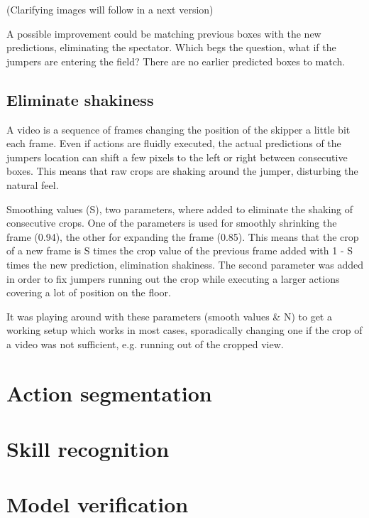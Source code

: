 (Clarifying images will follow in a next version)

A possible improvement could be matching previous boxes with the new predictions, eliminating the spectator. Which begs the question, what if the jumpers are entering the field? There are no earlier predicted boxes to match.

\subsection{Eliminate shakiness}

A video is a sequence of frames changing the position of the skipper a little bit each frame. Even if actions are fluidly executed, the actual predictions of the jumpers location can shift a few pixels to the left or right between consecutive boxes. This means that raw crops are shaking around the jumper, disturbing the natural feel.

Smoothing values (S), two parameters, where added to eliminate the shaking of consecutive crops. One of the parameters is used for smoothly shrinking the frame (0.94), the other for expanding the frame (0.85).
This means that the crop of a new frame is S times the crop value of the previous frame added with 1 - S times the new prediction, elimination shakiness. The second parameter was added in order to fix jumpers running out the crop while executing a larger actions covering a lot of position on the floor.

It was playing around with these parameters (smooth values \& N) to get a working setup which works in most cases, sporadically changing one if the crop of a video was not sufficient, e.g. running out of the cropped view.





\section{Action segmentation}

\section{Skill recognition}

\section{Model verification}